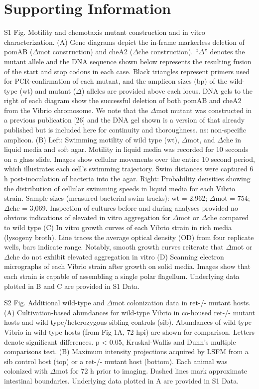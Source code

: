 \section{Supporting Information}
S1 Fig. Motility and chemotaxis mutant construction and in vitro characterization. 
(A) Gene diagrams depict the in-frame markerless deletion of pomAB ($\Delta$mot construction) and cheA2 ($\Delta$che construction). ``$\Delta$'' denotes the mutant allele and the DNA sequence shown below represents the resulting fusion of the start and stop codons in each case. Black triangles represent primers used for PCR-confirmation of each mutant, and the amplicon sizes (bp) of the wild-type (wt) and mutant ($\Delta$) alleles are provided above each locus. DNA gels to the right of each diagram show the successful deletion of both pomAB and cheA2 from the Vibrio chromosome. We note that the $\Delta$mot mutant was constructed in a previous publication [26] and the DNA gel shown is a version of that already published but is included here for continuity and thoroughness. ns: non-specific amplicon. (B) Left: Swimming motility of wild type (wt), $\Delta$mot, and $\Delta$che in liquid media and soft agar. Motility in liquid media was recorded for 10 seconds on a glass slide. Images show cellular movements over the entire 10 second period, which illustrates each cell's swimming trajectory. Swim distances were captured 6 h post-inoculation of bacteria into the agar. Right: Probability densities showing the distribution of cellular swimming speeds in liquid media for each Vibrio strain. Sample sizes (measured bacterial swim tracks): wt = 2,962; $\Delta$mot = 754; $\Delta$che = 3,069. Inspection of cultures before and during analyses provided no obvious indications of elevated in vitro aggregation for $\Delta$mot or $\Delta$che compared to wild type  (C) In vitro growth curves of each Vibrio strain in rich media (lysogeny broth). Line traces the average optical density (OD) from four replicate wells, bars indicate range. Notably, smooth growth curves reiterate that $\Delta$mot or $\Delta$che do not exhibit elevated aggregation in vitro  (D) Scanning electron micrographs of each Vibrio strain after growth on solid media. Images show that each strain is capable of assembling a single polar flagellum. Underlying data plotted in B and C are provided in S1 Data.

S2 Fig. Additional wild-type and $\Delta$mot colonization data in ret-/- mutant hosts. 
(A) Cultivation-based abundances for wild-type Vibrio in co-housed ret-/- mutant hosts and wild-type/heterozygous sibling controls (sib). Abundances of wild-type Vibrio in wild-type hosts (from Fig 1A, 72 hpi) are shown for comparison. Letters denote significant differences. p < 0.05, Kruskal-Wallis and Dunn's multiple comparisons test. (B) Maximum intensity projections acquired by LSFM from a sib control host (top) or a ret-/- mutant host (bottom). Each animal was colonized with $\Delta$mot for 72 h prior to imaging. Dashed lines mark approximate intestinal boundaries. Underlying data plotted in A are provided in S1 Data.


